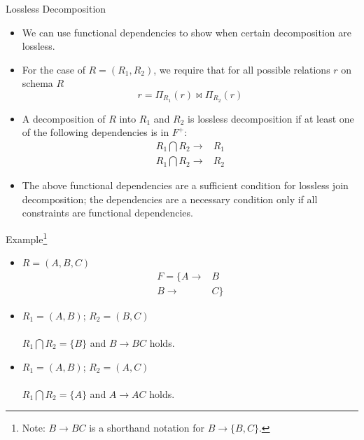 \documentclass{beamer}
\begin{document}
\begin{frame}{Lossless Decomposition}
    \begin{itemize}
        \item We can use functional dependencies to show when certain decomposition are lossless.
        \item For the case of $R = (R_1, R_2)$, we require that for all possible relations $r$ on schema $R$
            $$
                r = \Pi_{R_1}(r) \Join \Pi_{R_2}(r)
            $$
        \item A decomposition of $R$ into $R_1$ and $R_2$ is lossless decomposition if at least one of the following dependencies is in $F^+$:
        \begin{equation*}
            \begin{align*}
                R_1 \bigcap R_2 \rightarrow& R_1 \\
                R_1 \bigcap R_2 \rightarrow& R_2
            \end{align*}
        \end{equation*}
        \item The above functional dependencies are a sufficient condition for lossless join decomposition; the dependencies are a necessary condition only if all constraints are functional dependencies.
    \end{itemize}
\end{frame}

\begin{frame}{Example\footnote{Note: $B \rightarrow BC$ is a shorthand notation for $B \rightarrow \{B, C\}$.}}
    \begin{itemize}
        \item $R = (A, B, C)$
            \begin{equation*}
                \begin{align*}
                    F = \{  A \rightarrow& B \\
                            B \rightarrow& C\}
                \end{align*}
            \end{equation*}

        \item $R_1 = (A, B)$; $R_2 = (B, C)$ \\
             \\
            $R_1 \bigcap R_2 = \{B\}$  and $B \rightarrow BC$ holds.
        \item $R_1 = (A, B)$; $R_2 = (A, C)$ \\
             \\
            $R_1 \bigcap R_2 = \{A\}$  and $A \rightarrow AC$ holds.
    \end{itemize}
\end{frame}
\end{document}
